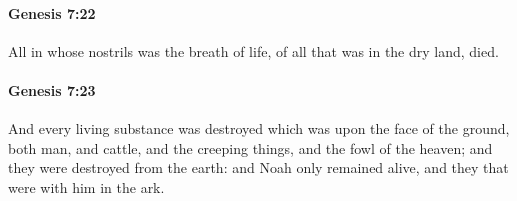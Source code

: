 		\paragraph{Genesis 7:22} %
			\label{GENESIS-7-22}

			All in whose nostrils was the breath of life, of all that was in the dry land, died.


		\paragraph{Genesis 7:23} %
			\label{GENESIS-7-23}

			And every living substance was destroyed which was upon the face of the ground, both man, and cattle, and the creeping things, and the fowl of the heaven; and they were destroyed from the earth: and Noah only remained alive, and they that were with him in the ark.


